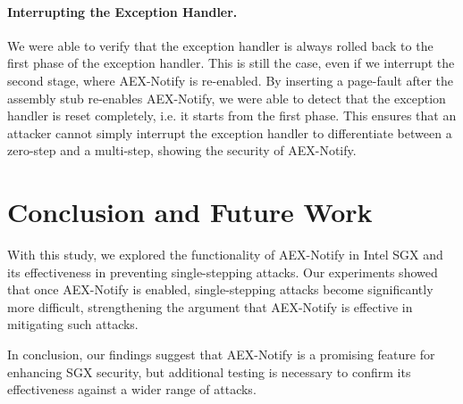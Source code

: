\documentclass{llncs}
\begin{document}

\paragraph{Interrupting the Exception Handler.}
We were able to verify that the exception handler is always rolled back to the first phase of the exception handler.
This is still the case, even if we interrupt the second stage, where AEX-Notify is re-enabled.
By inserting a page-fault after the assembly stub re-enables AEX-Notify,
we were able to detect that the exception handler is reset completely,
i.e. it starts from the first phase.
This ensures that an attacker cannot simply interrupt the exception handler
to differentiate between a zero-step and a multi-step,
showing the security of AEX-Notify.

\section{Conclusion and Future Work}

With this study, we explored the functionality of AEX-Notify in Intel SGX and
its effectiveness in preventing single-stepping attacks.
Our experiments showed that once AEX-Notify is enabled, single-stepping attacks become significantly more difficult, strengthening the argument that AEX-Notify is effective in mitigating such attacks.

In conclusion, our findings suggest that AEX-Notify is a promising feature for enhancing SGX security,
but additional testing is necessary to confirm its effectiveness against a wider range of attacks.


%

\end{document}
